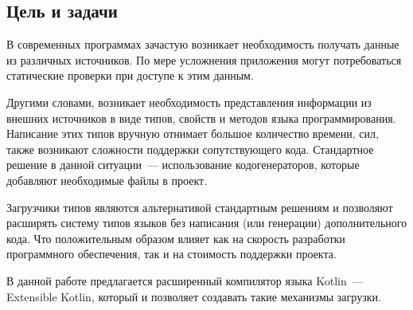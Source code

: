 \subsection{Цель и задачи}

В современных программах зачастую возникает необходимость получать данные из различных источников.
По мере усложнения приложения могут потребоваться статические проверки при доступе к этим данным.

Другими словами, возникает необходимость представления информации из внешних источников в виде типов, свойств и методов языка программирования.
Написание этих типов вручную отнимает большое количество времени, сил, также возникают сложности поддержки сопутствующего кода.
Стандартное решение в данной ситуации~--- использование кодогенераторов, которые добавляют необходимые файлы в проект.

Загрузчики типов являются альтернативой стандартным решениям и позволяют расширять систему типов языков без написания (или генерации) дополнительного кода.
Что положительным образом влияет как на скорость разработки программного обеспечения, так и на стоимость поддержки проекта.

В данной работе предлагается расширенный компилятор языка Kotlin~--- Extensible Kotlin, который и позволяет создавать такие механизмы загрузки.